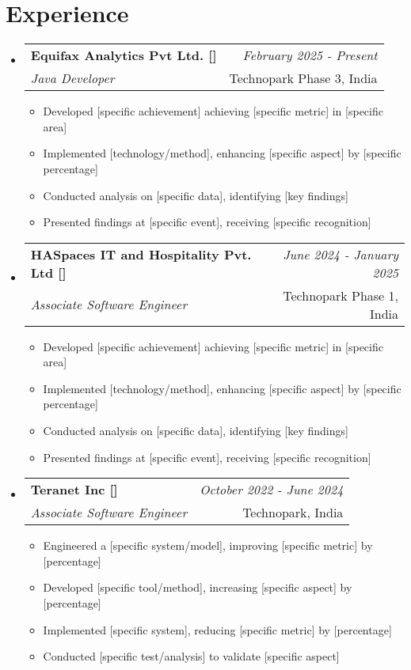 \documentclass[a4paper,10pt]{article}
\makeatletter
\newcommand{\resumeSubheading}[4]{
\vspace{0.5mm}\item
    \begin{tabular*}{0.98\textwidth}[t]{l@{\extracolsep{\fill}}r}
        \textbf{#1} & \textit{\footnotesize{#4}} \\
        \textit{\footnotesize{#3}} &  \footnotesize{#2}\\
    \end{tabular*}
    \vspace{-2.4mm}
}
\newcommand{\resumeSubHeadingListStart}{\begin{itemize}[leftmargin=*,labelsep=1mm]}
\newcommand{\resumeItemListStart}{\begin{itemize}[leftmargin=*,labelsep=1mm,itemsep=0.5mm]}
\newcommand{\resumeSubHeadingListEnd}{\end{itemize}\vspace{2mm}}
\newcommand{\resumeItemListEnd}{\end{itemize}\vspace{-2mm}}
\makeatother
\begin{document}
\section{\textbf{Experience}}
\vspace{-0.4mm}
\resumeSubHeadingListStart
\resumeSubheading
    {Equifax Analytics Pvt Ltd. [\href{https://careers.equifax.com/en/locations/trivandrum/}{\faIcon{building}}]}{Technopark Phase 3, India}
    {Java Developer}{February 2025 - Present}
    \resumeItemListStart
      \item Developed [specific achievement] achieving [specific metric] in [specific area]
      \item Implemented [technology/method], enhancing [specific aspect] by [specific percentage]
      \item Conducted analysis on [specific data], identifying [key findings]
      \item Presented findings at [specific event], receiving [specific recognition]
    \resumeItemListEnd
\resumeSubheading
    {HASpaces IT and Hospitality Pvt. Ltd [\href{https://www.haspaces.com/}{\faIcon{globe}}]}{Technopark Phase 1, India}
    {Associate Software Engineer}{June 2024 - January 2025}
    \resumeItemListStart
      \item Developed [specific achievement] achieving [specific metric] in [specific area]
      \item Implemented [technology/method], enhancing [specific aspect] by [specific percentage]
      \item Conducted analysis on [specific data], identifying [key findings]
      \item Presented findings at [specific event], receiving [specific recognition]
    \resumeItemListEnd
\resumeSubheading
    {Teranet Inc [\href{https://www.teranet.ca/}{\faIcon{globe}}]}{Technopark, India}
    {Associate Software Engineer}{October 2022 - June 2024}
    \resumeItemListStart
      \item Engineered a [specific system/model], improving [specific metric] by [percentage]
      \item Developed [specific tool/method], increasing [specific aspect] by [percentage]
      \item Implemented [specific system], reducing [specific metric] by [percentage]
      \item Conducted [specific test/analysis] to validate [specific aspect]
    \resumeItemListEnd
\resumeSubHeadingListEnd
\vspace{-6mm}
\end{document}
